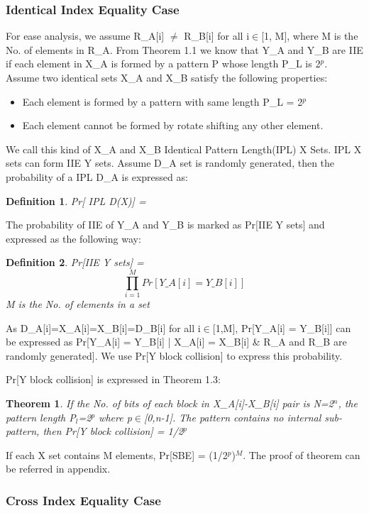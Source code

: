\documentclass{article}
\newtheorem{theorem}{Theorem}[section]
\newtheorem{defination}{Definition}[section]
\begin{document}
\subsubsection{Identical Index Equality Case}
For ease analysis, we assume R\_A[i] $\neq$ R\_B[i] for all i$\in$[1, M], where M is the No. of elements in R\_A.
From Theorem 1.1 we know that Y\_A and Y\_B are IIE if each element in X\_A is formed by a pattern P whose length P\_L is 2$^p$. 
Assume two identical sets X\_A and X\_B satisfy the following properties:
\begin{itemize}
	\item Each element is formed by a pattern with same length P\_L = 2$^p$
	\item Each element cannot be formed by rotate shifting any other element.
\end{itemize}
We call this kind of X\_A and X\_B Identical Pattern Length(IPL) X Sets. 
IPL X sets can form IIE Y sets.
Assume D\_A set is randomly generated, then the probability of a IPL D\_A is expressed as:
\begin{defination}
Pr[ IPL D(X)] = 
\end{defination} 

The probability of IIE of Y\_A and Y\_B is marked as Pr[IIE Y sets] and expressed as the following way:
\begin{defination}
Pr[IIE Y sets] = $$\prod_{i=1}^M Pr[Y\_A[i] = Y\_B[i]]$$ M is the No. of elements in a set
\end{defination} 

As D\_A[i]=X\_A[i]=X\_B[i]=D\_B[i] for all i$\in$[1,M], Pr[Y\_A[i] = Y\_B[i]] can be expressed as Pr[Y\_A[i] = Y\_B[i] | X\_A[i] = X\_B[i] \& R\_A and R\_B are randomly generated]. We use Pr[Y block collision] to express this probability. 

Pr[Y block collision] is expressed in Theorem 1.3:
\begin{theorem}
If the No. of bits of each block in X\_A[i]-X\_B[i] pair is N=2$^n$, the pattern length P$_l$=2$^p$ where p$\in$[0,n-1]. The pattern contains no internal sub-pattern, then Pr[Y block collision] = 1/2$^p$
\end{theorem}
If each X set contains M elements, Pr[SBE] = (1/2$^p$)$^M$.
The proof of theorem can be referred in appendix.

\subsubsection{Cross Index Equality Case}
\end{document}
